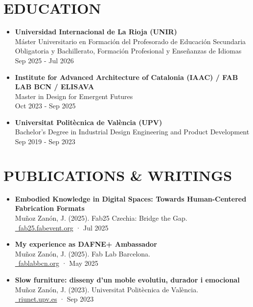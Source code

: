 \documentclass[11pt,a4paper]{article}
\begin{document}
\section*{EDUCATION}
\begin{itemize}[leftmargin=*,label={},itemsep=6pt]

    \item \textbf{Universidad Internacional de La Rioja (UNIR)}\\
    Máster Universitario en Formación del Profesorado de Educación Secundaria Obligatoria y Bachillerato, Formación Profesional y Enseñanzas de Idiomas\\
    Sep 2025 - Jul 2026 
    
    \item \textbf{Institute for Advanced Architecture of Catalonia (IAAC) / FAB LAB BCN / ELISAVA}\\
    Master in Design for Emergent Futures\\
    Oct 2023 - Sep 2025 
    
    \item \textbf{Universitat Politècnica de València (UPV)}\\
    Bachelor's Degree in Industrial Design Engineering and Product Development\\
    Sep 2019 - Sep 2023 
\end{itemize}

\section*{PUBLICATIONS \& WRITINGS}
\begin{itemize}[leftmargin=*,label={},itemsep=6pt]
    \item \textbf{Embodied Knowledge in Digital Spaces: Towards Human-Centered Fabrication Formats}\\
    Muñoz Zanón, J. (2025). Fab25 Czechia: Bridge the Gap.\\
    \href{https://zenodo.org/records/15819470}{\faLink\ fab25.fabevent.org} · Jul 2025
    \item \textbf{My experience as DAFNE+ Ambassador}\\
    Muñoz Zanón, J. (2025). Fab Lab Barcelona.\\
    \href{https://fablabbcn.org/blog/emergent-ideas/my-experience-as-dafne-ambassador}{\faLink\ fablabbcn.org} · May 2025
    \item \textbf{Slow furniture: disseny d'un moble evolutiu, durador i emocional}\\
    Muñoz Zanón, J. (2023). Universitat Politècnica de València.\\
    \href{https://riunet.upv.es/handle/10251/197203}{\faLink\ riunet.upv.es} · Sep 2023
\end{itemize}
\end{document}
